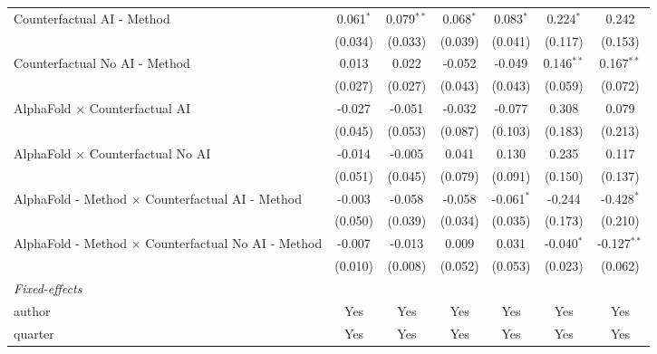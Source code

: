 \begin{tabular}{lcccccc}
   Counterfactual AI - Method                                 & 0.061$^{*}$ & 0.079$^{**}$ & 0.068$^{*}$ & 0.083$^{*}$  & 0.224$^{*}$    & 0.242\\   
                                                              & (0.034)     & (0.033)      & (0.039)     & (0.041)      & (0.117)        & (0.153)\\   
   Counterfactual No AI - Method                              & 0.013       & 0.022        & -0.052      & -0.049       & 0.146$^{**}$   & 0.167$^{**}$\\   
                                                              & (0.027)     & (0.027)      & (0.043)     & (0.043)      & (0.059)        & (0.072)\\   
   AlphaFold $\times$ Counterfactual AI                       & -0.027      & -0.051       & -0.032      & -0.077       & 0.308          & 0.079\\   
                                                              & (0.045)     & (0.053)      & (0.087)     & (0.103)      & (0.183)        & (0.213)\\   
   AlphaFold $\times$ Counterfactual No AI                    & -0.014      & -0.005       & 0.041       & 0.130        & 0.235          & 0.117\\   
                                                              & (0.051)     & (0.045)      & (0.079)     & (0.091)      & (0.150)        & (0.137)\\   
   AlphaFold - Method $\times$ Counterfactual AI - Method     & -0.003      & -0.058       & -0.058      & -0.061$^{*}$ & -0.244         & -0.428$^{*}$\\   
                                                              & (0.050)     & (0.039)      & (0.034)     & (0.035)      & (0.173)        & (0.210)\\   
   AlphaFold - Method $\times$ Counterfactual No AI - Method  & -0.007      & -0.013       & 0.009       & 0.031        & -0.040$^{*}$   & -0.127$^{**}$\\   
                                                              & (0.010)     & (0.008)      & (0.052)     & (0.053)      & (0.023)        & (0.062)\\   
   \midrule
   \emph{Fixed-effects}\\
   author                                                     & Yes         & Yes          & Yes         & Yes          & Yes            & Yes\\  
   quarter                                                    & Yes         & Yes          & Yes         & Yes          & Yes            & Yes\\  

\end{tabular}
